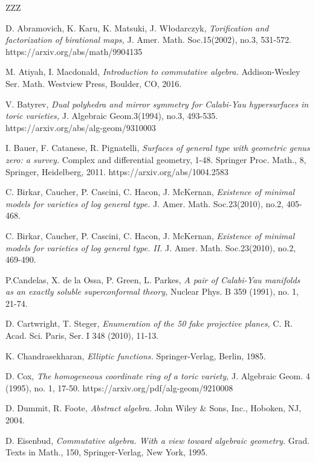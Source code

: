 \documentclass[11pt]{article}
\numberwithin{equation}{section}
\numberwithin{footnote}{section}
\begin{document}
\begin{thebibliography}{ZZZ}

 D. Abramovich, K. Karu, K. Matsuki, J. W\l{}odarczyk, 
\textit{Torification and factorization of birational maps,}
J. Amer. Math. Soc.15(2002), no.3, 531-572.
https://arxiv.org/abs/math/9904135

 M. Atiyah, I. Macdonald, \emph{Introduction to commutative algebra.}
Addison-Wesley Ser. Math.
Westview Press, Boulder, CO, 2016.

V. Batyrev, 
\textit{Dual polyhedra and mirror symmetry for Calabi-Yau hypersurfaces in toric varieties,}
J. Algebraic Geom.3(1994), no.3, 493-535.
https://arxiv.org/abs/alg-geom/9310003

 I. Bauer, F. Catanese, R. Pignatelli,
\textit{Surfaces of general type with geometric genus zero: a survey.} Complex and differential geometry, 1-48.
Springer Proc. Math., 8, Springer, Heidelberg, 2011.
https://arxiv.org/abs/1004.2583

C. Birkar, Caucher, P. Cascini, C. Hacon, J. McKernan, 
\textit{Existence of minimal models for varieties of log general type.}
J. Amer. Math. Soc.23(2010), no.2, 405-468.

C. Birkar, Caucher, P. Cascini, C. Hacon, J. McKernan, 
\textit{Existence of minimal models for varieties of log general type. II.}
J. Amer. Math. Soc.23(2010), no.2, 469-490.


 P.Candelas, X. de la Ossa, P. Green, L. Parkes, 
\textit{A pair of Calabi-Yau manifolds as an exactly soluble superconformal theory,}
Nuclear Phys. B 359 (1991), no. 1, 21-74.


 D. Cartwright, T. Steger, \textit{Enumeration of the 50 fake projective
planes,} C. R. Acad. Sci. Paris, Ser. I 348 (2010), 11-13.


 K. Chandrasekharan, \textit{Elliptic functions.}
Springer-Verlag, Berlin, 1985.


 D. Cox, \textit{The homogeneous coordinate ring of a toric variety,}
J. Algebraic Geom. 4 (1995), no. 1, 17-50.
https://arxiv.org/pdf/alg-geom/9210008

 D. Dummit, R. Foote,
\textit{Abstract algebra.}
John Wiley \& Sons, Inc., Hoboken, NJ, 2004.


 D. Eisenbud, \textit{Commutative algebra.
With a view toward algebraic geometry.}
Grad. Texts in Math., 150,
Springer-Verlag, New York, 1995.


\end{thebibliography}
\end{document}
